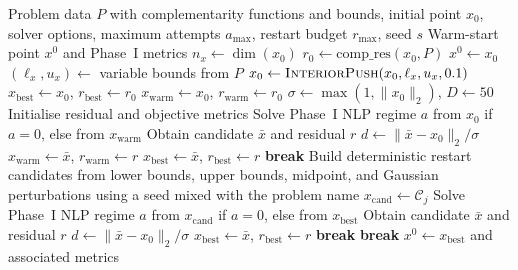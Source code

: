 \begin{algorithm}[H]
\caption{Phase~I Feasibility}
\label{alg:phase1}
\footnotesize
\begin{algorithmic}[1]
\Require Problem data $P$ with complementarity functions and bounds, initial point $x_0$, solver options, maximum attempts $a_{\max}$, restart budget $r_{\max}$, seed $s$
\Ensure Warm-start point $x^0$ and Phase~I metrics
\State $n_x \gets \dim(x_0)$
\State $r_0 \gets \mathrm{comp\_res}(x_0, P)$
  \State \Return $x^0 \gets x_0$
\EndIf
\State $(\ell_x, u_x) \gets$ variable bounds from $P$
\State $x_0 \gets \textsc{InteriorPush}(x_0, \ell_x, u_x, 0.1)$
\State $x_{\mathrm{best}} \gets x_0$, $r_{\mathrm{best}} \gets r_0$
\State $x_{\mathrm{warm}} \gets x_0$, $r_{\mathrm{warm}} \gets r_0$
\State $\sigma \gets \max(1, \|x_0\|_2)$, $D \gets 50$
\State Initialise residual and objective metrics
  \State Solve Phase~I NLP regime $a$ from $x_0$ if $a=0$, else from $x_{\mathrm{warm}}$
  \State Obtain candidate $\bar{x}$ and residual $r$
  \State $d \gets \|\bar{x} - x_0\|_2 / \sigma$
    \State $x_{\mathrm{warm}} \gets \bar{x}$, $r_{\mathrm{warm}} \gets r$
  \EndIf
    \State $x_{\mathrm{best}} \gets \bar{x}$, $r_{\mathrm{best}} \gets r$
  \EndIf
    \State \textbf{break}
  \EndIf
\EndFor
{}
  \State Build deterministic restart candidates from lower bounds, upper bounds, midpoint, and Gaussian perturbations using a seed mixed with the problem name
    \State $x_{\mathrm{cand}} \gets \mathcal C_j$
      \State Solve Phase~I NLP regime $a$ from $x_{\mathrm{cand}}$ if $a=0$, else from $x_{\mathrm{best}}$
      \State Obtain candidate $\bar{x}$ and residual $r$
      \State $d \gets \|\bar{x} - x_0\|_2 / \sigma$
        \State $x_{\mathrm{best}} \gets \bar{x}$, $r_{\mathrm{best}} \gets r$
      \EndIf
        \State \textbf{break}
      \EndIf
    \EndFor
      \State \textbf{break}
    \EndIf
  \EndFor
\EndIf
\State \Return $x^0 \gets x_{\mathrm{best}}$ and associated metrics
\end{algorithmic}
\end{algorithm}

